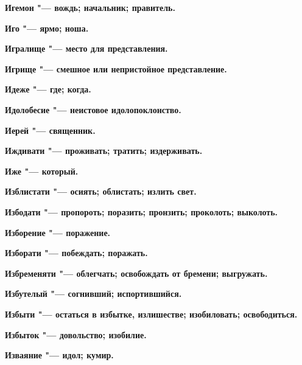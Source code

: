 \begin{mymulticols}{2}
\bfseries Игемон\normalfont{} "--- вождь; начальник; правитель. 




\bfseries Иго\normalfont{} "--- ярмо; ноша. 




\bfseries Игралище\normalfont{} "--- место для представления. 




\bfseries Игрище\normalfont{} "--- смешное или непристойное представление. 




\bfseries Идеже\normalfont{} "--- где; когда. 




\bfseries Идолобесие\normalfont{} "--- неистовое идолопоклонство. 




\bfseries Иерей\normalfont{} "--- священник. 




\bfseries Иждивати\normalfont{} "--- проживать; тратить; издерживать. 




\bfseries Иже\normalfont{} "--- который. 




\bfseries Изблистати\normalfont{} "--- осиять; облистать; излить свет. 




\bfseries Избодати\normalfont{} "--- пропороть; поразить; пронзить; проколоть; выколоть. 




\bfseries Изборение\normalfont{} "--- поражение. 




\bfseries Изборати\normalfont{} "--- побеждать; поражать. 




\bfseries Избременяти\normalfont{} "--- облегчать; освобождать от бремени; выгружать. 




\bfseries Избутелый\normalfont{} "--- согнивший; испортившийся. 




\bfseries Избыти\normalfont{} "--- остаться в избытке, излишестве; изобиловать; освободиться. 




\bfseries Избыток\normalfont{} "--- довольство; изобилие. 




\bfseries Изваяние\normalfont{} "--- идол; кумир. 





\end{mymulticols}
